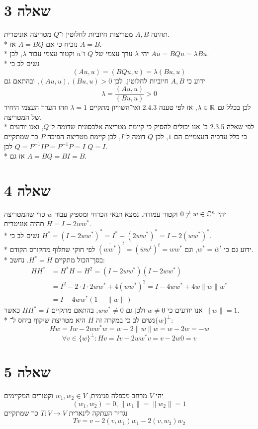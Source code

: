 \section{שאלה 3}
תהינה $A, B$ מטריצות חיוביות לחלוטין ו־$Q$ מטריצה אוניטרית. \\*
נוכיח כי אם $A = BQ$ אז $A = B$. \\*
יהי $\lambda$ ערך עצמי של $Q$ ו־$u$ וקטור עצמי עבור $\lambda$, לכן $A u = B Q u = \lambda B u$. \\*
נשים לב כי
\[
	(A u, u) = (B Q u, u) = \lambda (B u, u)
\]
ידוע כי $A, B$ חיוביות לחלוטין, לכן $(Au, u), (Bu, u) > 0$, ובהתאם גם
\[
	\lambda = \frac{(A u, u)}{(B u, u)} > 0
\]
לכן בכלל גם $\lambda \in \mathbb{R}$, אז לפי טענה 2.4.3 ואי־השוויון מתקיים $\lambda = 1$ וזהו הערך העצמי היחיד של המטריצה. \\*
לפי שאלה 2.3.5 ב' אנו יכולים להסיק כי קיימת מטריצה אלכסונית שדומה ל־$Q$, ואנו יודעים כי כלל ערכיה העצמיים הם $1$, לכן $Q$ דומה ל־$I$,
לכן קיימת מטריצה הפיכה $P$ כך שמתקיים $Q = P^{-1} I P = P^{-1} P = I$ לכן $Q = I$. \\*
אז גם $A = B Q = B I = B$.

\section{שאלה 4}
יהי $0 \ne w \in \mathbb{C}^n$ וקטור עמודה. נמצא תנאי הכרחי ומספיק עבור $w$ כדי שהמטריצה $H = I - 2 w w^*$ תהיה אוניטרית. \\*
נשים לב כי $H^* = (I - 2 ww^*)^* = I^* - (2ww^*)^* = I - 2(ww^*)^*$. \\*
ידוע גם כי $w^* = \overline{w}^t$, וגם $\overline{(w w^*)}^t = (\overline{w} w^t)^t = w w^*$ לפי חוקי שחלוף מהקורס הקודם. \\*
בסך־הכול מתקיים $H^* = H$. נחשב:
\begin{align*}
	H H^* & = H^* H = H^2 = (I - 2w w^*)(I - 2w w^*) \\
	& = I^2 - 2 \cdot I \cdot 2w w^* + 4(ww^*)^2 = I - 4ww^* + 4w \lVert w \rVert w^* \\
	& = I - 4 ww^* (1 - \lVert w \rVert)
\end{align*}
אנו יודעים כי $w \ne 0$ ולכן גם $ww^* \ne 0$, בהתאם מתקיים $H H^* = I$ כאשר $\lVert w \rVert = 1$. \\*
נשים לב כי במקרה זה $H$ היא מטריצת שיקוף ביחס ל־$\{ w \}^\perp$:
\[
	H w = I w - 2w w^* w = w - 2 \lVert w \rVert w = w - 2w = -w
\]
\[
	\forall v \in \{ w \}^\perp: H v = I v - 2 w w^* v = v - 2w 0 = v
\]

\section{שאלה 5}
יהי $V$ מרחב מכפלה פנימית, $w_1, w_2 \in V$ וקטורים המקיימים
\[
	(w_1, w_2) = 0, \lVert w_1 \rVert = \lVert w_2 \rVert = 1
\]
נגדיר העתקה לינארית $T: V \to V$ כך שמתקיים
\[
	Tv = v - 2(v, w_1) w_1 - 2(v, w_2) w_2
\]
